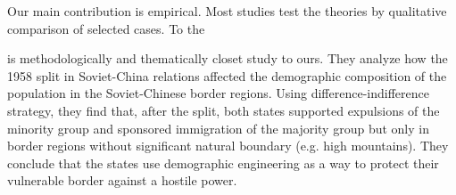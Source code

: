 Our main contribution is empirical. Most studies test the theories by qualitative comparison of selected cases. To the 

\citet{mcnamee_demographic_nodate} is methodologically and thematically closet study to ours. They analyze how the 1958 split in Soviet-China relations affected the demographic composition of the population in the Soviet-Chinese border regions.
Using difference-indifference strategy, they find that, after the split,  both states supported expulsions  of the minority group and sponsored immigration of the majority group but only in border regions without significant natural boundary (e.g. high mountains). They conclude that the states use demographic engineering as a way to protect their vulnerable border against a hostile power. 


